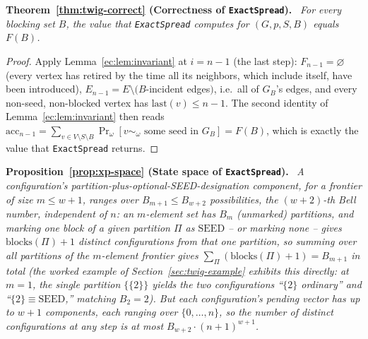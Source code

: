 \documentclass[11pt]{article}
\theoremstyle{definition}
\theoremstyle{remark}
\newenvironment{repeattheorem}[1][]{\par\medskip\noindent\textbf{#1.}\ \itshape}{\par\medskip}
\newenvironment{repeatproposition}[1][]{\par\medskip\noindent\textbf{#1.}\ \itshape}{\par\medskip}
\newcommand{\FF}{F}
\begin{document}
\begin{repeattheorem}[Theorem~\ref{thm:twig-correct} (Correctness of \texttt{ExactSpread})]
For every blocking set $B$, the value that \texttt{ExactSpread} computes for $(G,p,S,B)$ equals $\FF(B)$.
\end{repeattheorem}
\begin{proof}
Apply Lemma~\ref{ec:lem:invariant} at $i=n-1$ (the last step): $F_{n-1}
=\varnothing$ (every vertex has retired by the time all its neighbors,
which include itself, have been introduced), $E_{n-1}=E\setminus(B$-incident
edges$)$, i.e.\ all of $G_B$'s edges, and every non-seed, non-blocked
vertex has $\mathrm{last}(v)\le n-1$. The second identity of
Lemma~\ref{ec:lem:invariant} then reads $\mathrm{acc}_{n-1}=
\sum_{v\in V\setminus S\setminus B}\Pr_\omega[v\sim_\omega\text{ some seed
in }G_B]=\FF(B)$, which is exactly the value that \texttt{ExactSpread}
returns.
\end{proof}

\begin{repeatproposition}[Proposition~\ref{prop:xp-space} (State space of \texttt{ExactSpread})]
A configuration's partition-plus-optional-SEED-designation component,
for a frontier of size $m\le w+1$, ranges over $B_{m+1}\le B_{w+2}$
possibilities, the $(w+2)$-th Bell number, independent of $n$: an
$m$-element set has $B_m$ (unmarked) partitions, and marking one block of a
given partition $\Pi$ as $\mathrm{SEED}$ -- or marking none -- gives
$\mathrm{blocks}(\Pi)+1$ distinct configurations from that one partition, so
summing over all partitions of the $m$-element frontier gives
$\sum_\Pi(\mathrm{blocks}(\Pi)+1)=B_{m+1}$ in total (the worked example of
Section~\ref{sec:twig-example} exhibits this directly: at $m=1$, the single
partition $\{\{2\}\}$ yields the two configurations ``$\{2\}$ ordinary'' and
``$\{2\}\equiv\mathrm{SEED}$,'' matching $B_2=2$). But each configuration's
pending vector has up to $w+1$ components, each ranging over
$\{0,\dots,n\}$, so the number of distinct configurations at any step is at
most $B_{w+2}\cdot(n+1)^{w+1}$.
\end{repeatproposition}
\end{document}
